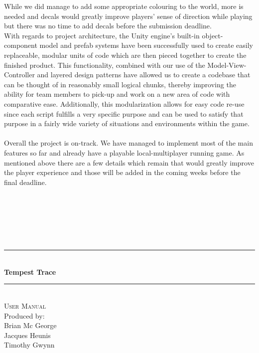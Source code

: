 \documentclass[11pt,a4paper]{article}
\begin{document}
While we did manage to add some appropriate colouring to the world, more is needed and decals would greatly improve players' sense of direction while playing but there was no time to add decals before the submission deadline. \\
With regards to project architecture, the Unity engine's built-in object-component model and prefab systems have been successfully used to create easily replaceable, modular units of code which are then pieced together to create the finished product. This functionality, combined with our use of the Model-View-Controller and layered design patterns have allowed us to create a codebase that can be thought of in reasonably small logical chunks, thereby improving the ability for team members to pick-up and work on a new area of code with comparative ease. Additionally, this modularization allows for easy code re-use since each script fulfills a very specific purpose and can be used to satisfy that purpose in a fairly wide variety of situations and environments within the game.
\\ \\
Overall the project is on-track. We have managed to implement most of the main features so far and already have a playable local-multiplayer running game. As mentioned above there are a few details which remain that would greatly improve the player experience and those will be added in the coming weeks before the final deadline.

\newpage
    \begin{titlepage} \begin{center}
            \textsc{}
            \\[1.5cm] \textsc{} \\\smallskip
            \textsc{} \\\smallskip
            \textsc{} \\\smallskip
            \textsc{} \\\smallskip
            \noindent\rule[0.4mm]{\textwidth}{0.1mm}
            \\[0.4cm] { \huge \bfseries Tempest Trace \\[0.4cm] }
            \noindent\rule[0.4mm]{\textwidth}{0.1mm}
            \\[1cm]
            \textsc{\large{User Manual}}
            \\[14.5cm]
\large{Produced by:\\ Brian Mc George\\ Jacques Heunis\\ Timothy Gwynn}
    \end{center}
\end{titlepage}
\newpage
\label{ss:user-manual}
\end{document}
